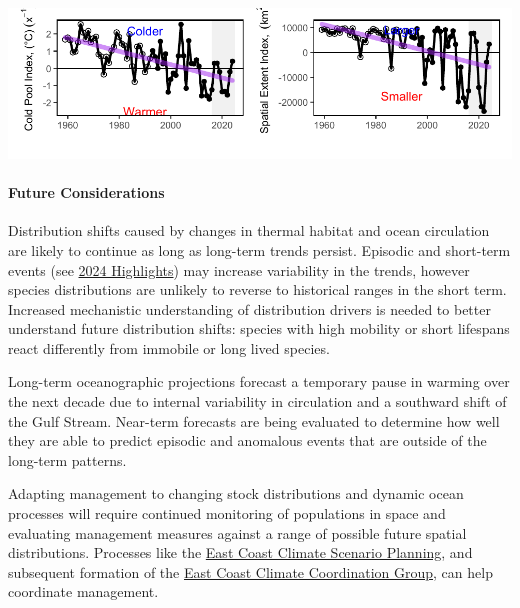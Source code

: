 \documentclass[
  10pt,
]{article}
\let\origfigure\figure
\let\endorigfigure\endfigure
\renewenvironment{figure}[1][2] {
    \expandafter\origfigure\expandafter[H]
} {
    \endorigfigure
}
\begin{document}
\begin{figure}

{\centering \includegraphics{midatlantic_files/figure-latex/cold-pool-size-1} 

}

\caption{Seasonal cold pool mean temperature (left) and spatial extent index (right), based on bias-corrected ROMS-NWA (open circles) and GLORYS (closed circles), with declining trends (purple).}\label{fig:cold-pool-size}
\end{figure}

\paragraph{Future Considerations}\label{future-considerations}

Distribution shifts caused by changes in thermal habitat and ocean circulation are likely to continue as long as long-term trends persist. Episodic and short-term events (see \hyperref[highlights]{2024 Highlights}) may increase variability in the trends, however species distributions are unlikely to reverse to historical ranges in the short term. Increased mechanistic understanding of distribution drivers is needed to better understand future distribution shifts: species with high mobility or short lifespans react differently from immobile or long lived species.

Long-term oceanographic projections forecast a temporary pause in warming over the next decade due to internal variability in circulation and a southward shift of the Gulf Stream. Near-term forecasts are being evaluated to determine how well they are able to predict episodic and anomalous events that are outside of the long-term patterns.

Adapting management to changing stock distributions and dynamic ocean processes will require continued monitoring of populations in space and evaluating management measures against a range of possible future spatial distributions. Processes like the \href{https://www.mafmc.org/climate-change-scenario-planning}{East Coast Climate Scenario Planning}, and subsequent formation of the \href{https://www.mafmc.org/e3cg}{East Coast Climate Coordination Group}, can help coordinate management.
\end{document}

